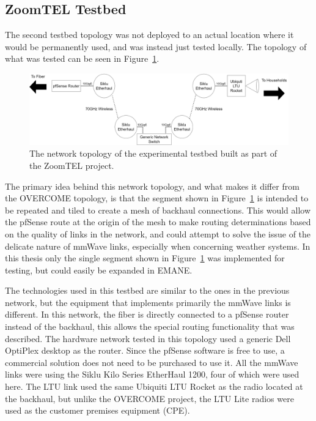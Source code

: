 \subsection{ZoomTEL Testbed}
The second testbed topology was not deployed to an actual location where it would be permanently used, and was instead just tested locally.
The topology of what was tested can be seen in Figure~\ref{zoomtel_topology}.
\begin{figure}[!ht]
    \centering
    \includegraphics[width=\textwidth,keepaspectratio]{Images/Chpt3/ZoomTEL_Topology.png}
    \caption{The network topology of the experimental testbed built as part of the ZoomTEL project.}
    \label{zoomtel_topology}
\end{figure}
The primary idea behind this network topology, and what makes it differ from the OVERCOME topology, is that the segment shown in Figure~\ref{zoomtel_topology} is intended to be repeated and tiled to create a mesh of backhaul connections.
This would allow the pfSense route at the origin of the mesh to make routing determinations based on the quality of links in the network, and could attempt to solve the issue of the delicate nature of mmWave links, especially when concerning weather systems.
In this thesis only the single segment shown in Figure~\ref{zoomtel_topology} was implemented for testing, but could easily be expanded in EMANE.\par
The technologies used in this testbed are similar to the ones in the previous network, but the equipment that implements primarily the mmWave links is different.
In this network, the fiber is directly connected to a pfSense router instead of the backhaul, this allows the special routing functionality that was described.
The hardware network tested in this topology used a generic Dell OptiPlex desktop as the router.
Since the pfSense software is free to use, a commercial solution does not need to be purchased to use it.
All the mmWave links were using the Siklu Kilo Series EtherHaul 1200, four of which were used here.
The LTU link used the same Ubiquiti LTU Rocket as the radio located at the backhaul, but unlike the OVERCOME project, the LTU Lite radios were used as the customer premises equipment (CPE).


